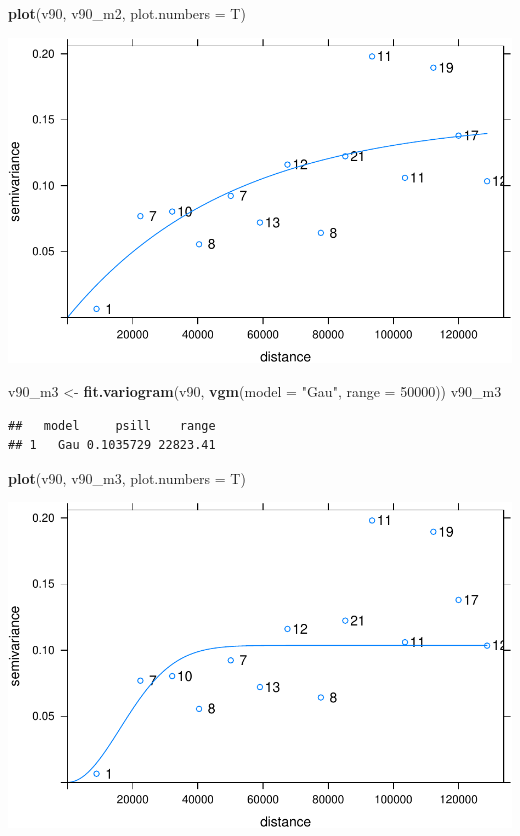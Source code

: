 \documentclass[11pt,]{article}
\newenvironment{Shaded}{\begin{snugshade}}{\end{snugshade}}
\newcommand{\KeywordTok}[1]{\textcolor[rgb]{0.13,0.29,0.53}{\textbf{#1}}}
\newcommand{\DataTypeTok}[1]{\textcolor[rgb]{0.13,0.29,0.53}{#1}}
\newcommand{\DecValTok}[1]{\textcolor[rgb]{0.00,0.00,0.81}{#1}}
\newcommand{\StringTok}[1]{\textcolor[rgb]{0.31,0.60,0.02}{#1}}
\newcommand{\NormalTok}[1]{#1}
\begin{document}
\begin{Shaded}
\begin{Highlighting}[]
\KeywordTok{plot}\NormalTok{(v90, v90_m2, }\DataTypeTok{plot.numbers =}\NormalTok{ T)}
\end{Highlighting}
\end{Shaded}

\includegraphics[width=800px]{Proyecto-Precipitaciones_files/figure-latex/vgm-pre1990-ajus-exp-2}

\begin{Shaded}
\begin{Highlighting}[]
\NormalTok{v90_m3 <-}\StringTok{ }\KeywordTok{fit.variogram}\NormalTok{(v90, }\KeywordTok{vgm}\NormalTok{(}\DataTypeTok{model =} \StringTok{"Gau"}\NormalTok{, }\DataTypeTok{range =} \DecValTok{50000}\NormalTok{))}
\NormalTok{v90_m3}
\end{Highlighting}
\end{Shaded}

\begin{verbatim}
##   model     psill    range
## 1   Gau 0.1035729 22823.41
\end{verbatim}

\begin{Shaded}
\begin{Highlighting}[]
\KeywordTok{plot}\NormalTok{(v90, v90_m3, }\DataTypeTok{plot.numbers =}\NormalTok{ T)}
\end{Highlighting}
\end{Shaded}

\includegraphics[width=800px]{Proyecto-Precipitaciones_files/figure-latex/vgm-pre1990-ajus-exp-3}
\end{document}
